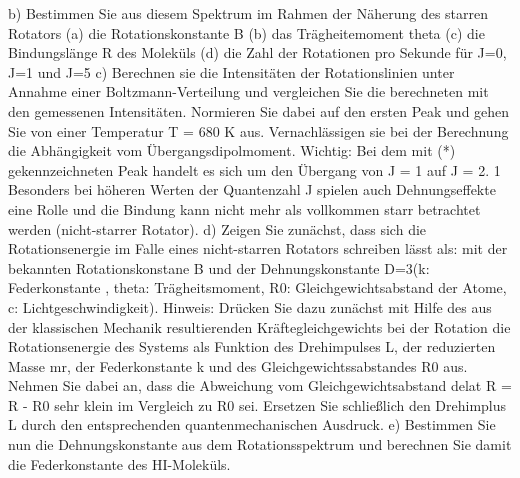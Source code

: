 b) Bestimmen Sie aus diesem Spektrum im Rahmen der Näherung des starren Rotators
(a) die Rotationskonstante B (b) das Trägheitemoment theta
(c) die Bindungslänge R des Moleküls
(d) die Zahl der Rotationen pro Sekunde für J=0, J=1 und J=5
c) Berechnen sie die Intensitäten der Rotationslinien unter Annahme einer Boltzmann-Verteilung und vergleichen Sie die berechneten mit den gemessenen Intensitäten. Normieren Sie dabei auf den ersten Peak und gehen Sie von einer Temperatur T = 680 K aus. Vernachlässigen sie bei der Berechnung die Abhängigkeit vom Übergangsdipolmoment. Wichtig: Bei dem mit (*) gekennzeichneten Peak handelt es sich um den Übergang von J = 1 auf J = 2.
   1
Besonders bei höheren Werten der Quantenzahl J spielen auch Dehnungseffekte eine Rolle und die Bindung kann nicht mehr als vollkommen starr betrachtet werden (nicht-starrer Rotator).
d) Zeigen Sie zunächst, dass sich die Rotationsenergie im Falle eines nicht-starren Rotators schreiben lässt als:
mit der bekannten Rotationskonstane B und der Dehnungskonstante D=3(k: Federkonstante
, theta: Trägheitsmoment, R0: Gleichgewichtsabstand der Atome, c: Lichtgeschwindigkeit).
Hinweis: Drücken Sie dazu zunächst mit Hilfe des aus der klassischen Mechanik resultierenden Kräftegleichgewichts bei der Rotation die Rotationsenergie des Systems als Funktion des Drehimpulses L, der reduzierten Masse mr, der Federkonstante k und des Gleichgewichtssabstandes R0 aus. Nehmen Sie dabei an, dass die Abweichung vom Gleichgewichtsabstand delat R = R - R0 sehr klein im Vergleich zu R0 sei. Ersetzen Sie schließlich den Drehimplus L durch den entsprechenden quantenmechanischen Ausdruck.
e) Bestimmen Sie nun die Dehnungskonstante aus dem Rotationsspektrum und berechnen Sie damit die Federkonstante des HI-Moleküls.
